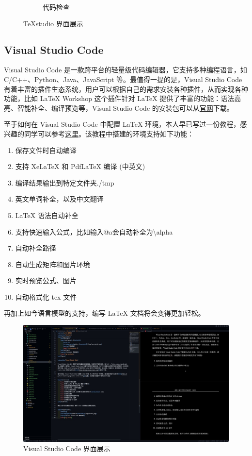 \begin{figure}[htb!]
\begin{subfigure}{.3\textwidth}
        \caption{代码检查}
        \label{fig_texstudio_3}
    \end{subfigure}
    \caption{TeXstudio 界面展示}
    \label{fig_texstudio}
\end{figure}

\subsection{Visual Studio Code}

Visual Studio Code 是一款跨平台的轻量级代码编辑器，它支持多种编程语言，如 C/C++、Python、Java、JavaScript 等。最值得一提的是，Visual Studio Code 有着丰富的插件生态系统，用户可以根据自己的需求安装各种插件，从而实现各种功能，比如 LaTeX Workshop 这个插件针对 LaTeX 提供了丰富的功能：语法高亮、智能补全、编译预览等，Visual Studio Code 的安装包可以从\href{https://code.visualstudio.com/}{官网}下载。

至于如何在 Visual Studio Code 中配置 LaTeX 环境，本人早已写过一份教程，感兴趣的同学可以参考\href{https://github.com/shinyypig/latex-vscode-config}{这里}。该教程中搭建的环境支持如下功能：

\begin{enumerate}
    \item 保存文件时自动编译
    \item 支持 XeLaTeX 和 PdfLaTeX 编译 (中英文)
    \item 编译结果输出到特定文件夹./tmp
    \item 英文单词补全，以及中文翻译
    \item LaTeX 语法自动补全
    \item 支持快速输入公式，比如输入@a会自动补全为\textbackslash alpha
    \item 自动补全路径
    \item 自动生成矩阵和图片环境
    \item 实时预览公式、图片
    \item 自动格式化 tex 文件
\end{enumerate}

再加上如今语言模型的支持，编写 LaTeX 文档将会变得更加轻松。

\begin{figure}[htb!]
    \centering
    \includegraphics[width=.9\textwidth]{./img/vscode.jpeg}
    \caption{Visual Studio Code 界面展示}
    \label{fig_vscode}
\end{figure}

